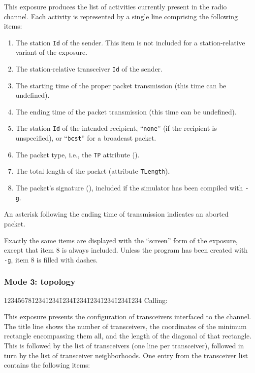 This exposure produces the list of activities currently present in the
radio channel.
Each activity is represented by a single line comprising the following
items:

\begin{enumerate}
\item
The station {\tt Id} of the sender.
This item is not included for a station-relative variant of the exposure.
\item
The station-relative transceiver {\tt Id} of the sender.
\item
The starting time of the proper packet transmission (this time can be
undefined).
\item
The ending time of the packet transmission (this time can be undefined).
\item
The station {\tt Id} of the intended recipient, ``{\tt none}'' (if the recipient
is unspecified), or ``{\tt bcst}'' for a broadcast packet.
\item
The packet type, i.e., the {\tt TP} attribute ().
\item
The total length of the packet (attribute {\tt TLength}).
\item
The packet's signature (), included if the simulator
has been compiled with {\tt -g}.
\end{enumerate}

An asterisk following the ending time of transmission indicates an aborted
packet.

Exactly the same items are displayed with the ``screen''
form of the exposure, except that item 8 is always included.
Unless the program has been created with {\tt -g}, item 8 is filled
with dashes.

\subsubsection*{Mode 3: topology}

{\tt\begin{tabbing}
12345678\=1234\=1234\=1234\=1234\=1234\=1234\=1234\=1234\kill
{\rm Calling:}
\end{tabbing}}

This exposure presents the configuration of transceivers
interfaced to the channel.
The title line shows the number of transceivers, the coordinates of the
minimum rectangle encompassing them all, and the length of the
diagonal of that rectangle.
This is followed by the list of transceivers (one line per transceiver),
followed in turn by the list of transceiver neighborhoods.
One entry from the transceiver list contains the following items:

